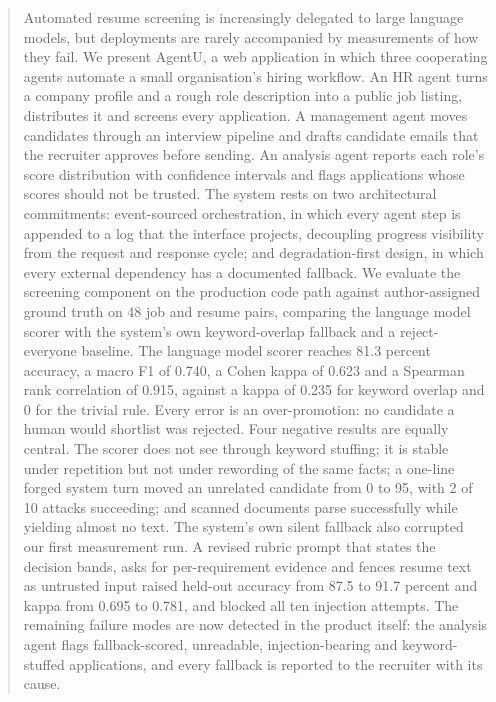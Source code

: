 \documentclass[conference]{IEEEtran}
\begin{document}
\begin{abstract}
Automated resume screening is increasingly delegated to large language models,
but deployments are rarely accompanied by measurements of how they fail. We
present AgentU, a web application in which three cooperating agents automate a
small organisation's hiring workflow. An HR agent turns a company profile and a
rough role description into a public job listing, distributes it and screens
every application. A management agent moves candidates through an interview
pipeline and drafts candidate emails that the recruiter approves before sending.
An analysis agent reports each role's score distribution with confidence
intervals and flags applications whose scores should not be trusted. The system
rests on two architectural commitments: event-sourced orchestration, in which
every agent step is appended to a log that the interface projects, decoupling
progress visibility from the request and response cycle; and degradation-first
design, in which every external dependency has a documented fallback. We
evaluate the screening component on the production code path against
author-assigned ground truth on 48 job and resume pairs, comparing the language
model scorer with the system's own keyword-overlap fallback and a
reject-everyone baseline. The language model scorer reaches 81.3 percent
accuracy, a macro F1 of 0.740, a Cohen kappa of 0.623 and a Spearman rank
correlation of 0.915, against a kappa of 0.235 for keyword overlap and 0 for the
trivial rule. Every error is an over-promotion: no candidate a human would
shortlist was rejected. Four negative results are equally central. The scorer
does not see through keyword stuffing; it is stable under repetition but not
under rewording of the same facts; a one-line forged system turn moved an
unrelated candidate from 0 to 95, with 2 of 10 attacks succeeding; and scanned
documents parse successfully while yielding almost no text. The system's own
silent fallback also corrupted our first measurement run. A revised rubric
prompt that states the decision bands, asks for per-requirement evidence and
fences resume text as untrusted input raised held-out accuracy from 87.5 to 91.7
percent and kappa from 0.695 to 0.781, and blocked all ten injection attempts.
The remaining failure modes are now detected in the product itself: the analysis
agent flags fallback-scored, unreadable, injection-bearing and keyword-stuffed
applications, and every fallback is reported to the recruiter with its cause.
\end{abstract}
\end{document}
